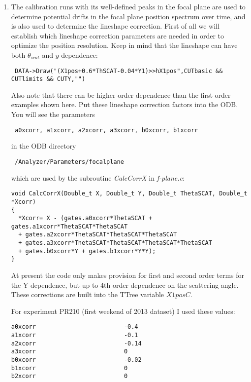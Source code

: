 \documentclass[11pt]{report}
\begin{document}
\begin{enumerate}
\item 
The calibration runs with its well-defined peaks in the focal plane are used to
determine potential drifts in the focal plane position spectrum over time, and is also
used to determine the lineshape correction.
First of all we will 
establish which lineshape correction parameters are needed in order to optimize the position resolution.
Keep in mind that the lineshape can have both $\theta_{scat}$ and $y$ dependence:
\begin{verbatim} DATA->Draw("(X1pos+0.6*ThSCAT-0.04*Y1)>>hX1pos",CUTbasic && CUTlimits && CUTY,"")  \end{verbatim}
Also note that there can be higher order dependence than the first order examples shown here.
Put these lineshape correction factors into the ODB.
You will see the parameters
\begin{verbatim} a0xcorr, a1xcorr, a2xcorr, a3xcorr, b0xcorr, b1xcorr \end{verbatim}
in the ODB directory
\begin{verbatim} /Analyzer/Parameters/focalplane  \end{verbatim}
which are used by the subroutine {\it CalcCorrX} in {\it f-plane.c}: 
\begin{verbatim} 
void CalcCorrX(Double_t X, Double_t Y, Double_t ThetaSCAT, Double_t *Xcorr)
{
  *Xcorr= X - (gates.a0xcorr*ThetaSCAT + gates.a1xcorr*ThetaSCAT*ThetaSCAT 
  + gates.a2xcorr*ThetaSCAT*ThetaSCAT*ThetaSCAT 
  + gates.a3xcorr*ThetaSCAT*ThetaSCAT*ThetaSCAT*ThetaSCAT 
  + gates.b0xcorr*Y + gates.b1xcorr*Y*Y);
}
\end{verbatim}
At present the code only makes provision for first and second order terms for the Y dependence, but
up to 4th order dependence on the scattering angle.
These corrections are built into the TTree variable $X1posC$.  

For experiment PR210 (first weekend of 2013 dataset) I used these values:
\begin{verbatim}
a0xcorr                         -0.4
a1xcorr                         -0.1
a2xcorr                         -0.14
a3xcorr                         0
b0xcorr                         -0.02
b1xcorr                         0
b2xcorr                         0
\end{verbatim}

\bigskip


\end{enumerate}
\end{document}
